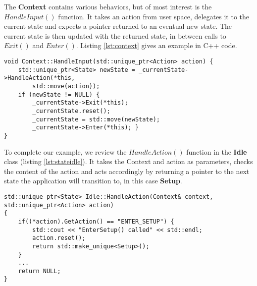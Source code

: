 The \textbf{Context} contains various behaviors, but of most interest is the $HandleInput()$ function. It takes an action from user space, delegates it to the current state and expects a pointer returned to an eventual new state. The current state is then updated with the returned state, in between calls to $Exit()$ and $Enter()$. Listing \ref{lst:context} gives an example in C++ code.

\begin{lstlisting}[style=customc++,caption={The Context class holds the current state among other variables, such as best chromosome so far and parameters. Here is showed the function HandleInput() called from user side.},label={lst:context}]
void Context::HandleInput(std::unique_ptr<Action> action) {
	std::unique_ptr<State> newState = _currentState->HandleAction(*this,
		std::move(action));
	if (newState != NULL) {
		_currentState->Exit(*this);
		_currentState.reset();
		_currentState = std::move(newState);
		_currentState->Enter(*this); }
}
\end{lstlisting}

To complete our example, we review the $HandleAction()$ function in the \textbf{Idle} class (listing \ref{lst:stateidle}). It takes the Context and action as parameters, checks the content of the action and acts accordingly by returning a pointer to the next state the application will transition to, in this case \textbf{Setup}.

\begin{lstlisting}[style=customc++,caption={The HandleAction() function in state Idle.},label={lst:stateidle}]
std::unique_ptr<State> Idle::HandleAction(Context& context, std::unique_ptr<Action> action)
{
	if((*action).GetAction() == "ENTER_SETUP") {
		std::cout << "EnterSetup() called" << std::endl;
		action.reset();
		return std::make_unique<Setup>();
	}
	...
	return NULL;
}
\end{lstlisting}

